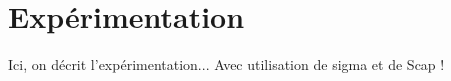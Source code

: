 \chapter{Expérimentation}

Ici, on décrit l'expérimentation...  Avec utilisation de \gls{sigma} et
de \gls{Scap} !



